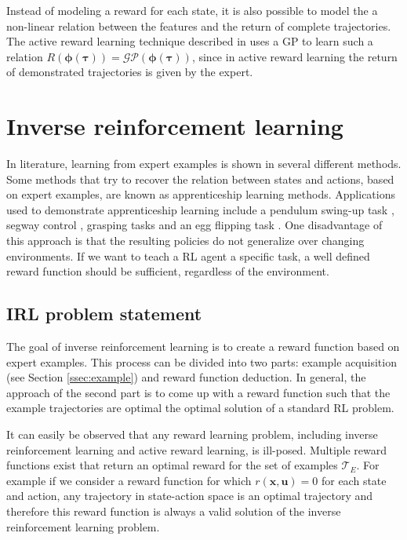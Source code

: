 \documentclass[mscThesis.tex]{subfiles}
\begin{document}
Instead of modeling a reward for each state, it is also possible to model the a non-linear relation between the features and the return of complete trajectories. The active reward learning technique described in \cite{Daniel2014} uses a GP to learn such a relation $R(\bm{\phi}(\bm{\tau})) = \mathcal{GP}(\bm{\phi}(\bm{\tau}))$, since in active reward learning the return of demonstrated trajectories is given by the expert.


\section{Inverse reinforcement learning}
\label{sec:irl}
In literature, learning from expert examples is shown in several different methods. Some methods that try to recover the relation between states and actions, based on expert examples, are known as apprenticeship learning methods. Applications used to demonstrate apprenticeship learning include a pendulum swing-up task \cite{atkeson1997robot}, segway control \cite{browning2004skill}, grasping tasks \cite{sweeney2007model} and an egg flipping task \cite{pook1993recognizing}. One disadvantage of this approach is that the resulting policies do not generalize over changing environments. If we want to teach a RL agent a specific task, a well defined reward function should be sufficient, regardless of the environment.

\subsection{IRL problem statement}
The goal of inverse reinforcement learning is to create a reward function based on expert examples. This process can be divided into two parts: example acquisition (see Section \ref{ssec:example}) and reward function deduction. In general, the approach of the second part is to come up with a reward function such that the example trajectories are optimal the optimal solution of a standard RL problem. 

 It can easily be observed that any reward learning problem, including inverse reinforcement learning and active reward learning, is ill-posed. Multiple reward functions exist that return an optimal reward for the set of examples $\mathcal{T}_E$. For example if we consider a reward function for which $r(\bm{x}, \bm{u}) = 0$ for each state and action, any trajectory in state-action space is an optimal trajectory and therefore this reward function is always a valid solution of the inverse reinforcement learning problem. 
\end{document}
